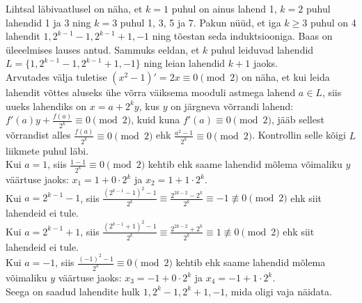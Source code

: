 \documentclass[a4paper, 10pt]{article}
\begin{document}
\bigskip
Lihtsal läbivaatlusel on näha, et $k=1$ puhul on ainus lahend 1, $k=2$ puhul lahendid 1 ja 3 ning $k=3$ puhul 1, 3, 5 ja 7. Pakun nüüd, et iga $k\geq3$ puhul on 4 lahendit $1,2^{k-1}-1,2^{k-1}+1,-1$ ning tõestan seda induktsiooniga. Baas on üleeelmises lauses antud. Sammuks eeldan, et $k$ puhul leiduvad lahendid $L=\{1,2^{k-1}-1,2^{k-1}+1,-1\}$ ning leian lahendid $k+1$ jaoks.\\
Arvutades välja tuletise $(x^2-1)'=2x\equiv0\pmod2$ on näha, et kui leida lahendit võttes aluseks ühe võrra väiksema mooduli astmega lahend $a\in L$, siis uueks lahendiks on $x=a+2^ky$, kus $y$ on järgneva võrrandi lahend: $f'(a)y+\frac{f(a)}{2^k}\equiv0\pmod{2}$, kuid kuna $f'(a)\equiv0\pmod2$, jääb sellest võrrandist alles $\frac{f(a)}{2^k}\equiv0\pmod{2}$ ehk $\frac{a^2-1}{2^k}\equiv0\pmod{2}$. Kontrollin selle kõigi $L$ liikmete puhul läbi.\\
Kui $a=1$, siis $\frac{1-1}{2^k}\equiv0\pmod{2}$ kehtib ehk saame lahendid mõlema võimaliku $y$ väärtuse jaoks: $x_1=1+0\cdot2^k$ ja $x_2=1+1\cdot2^k$.\\
Kui $a=2^{k-1}-1$, siis $\frac{(2^{k-1}-1)^2-1}{2^k}\equiv\frac{2^{2k-2}-2^k}{2^k}\equiv-1\not\equiv0\pmod{2}$ ehk siit lahendeid ei tule.\\
Kui $a=2^{k-1}+1$, siis $\frac{(2^{k-1}+1)^2-1}{2^k}\equiv\frac{2^{2k-2}+2^k}{2^k}\equiv1\not\equiv0\pmod{2}$ ehk siit lahendeid ei tule.\\
Kui $a=-1$, siis $\frac{(-1)^2-1}{2^k}\equiv0\pmod{2}$ kehtib ehk saame lahendid mõlema võimaliku $y$ väärtuse jaoks: $x_3=-1+0\cdot2^k$ ja $x_4=-1+1\cdot2^k$.\\
Seega on saadud lahendite hulk $1,2^k-1,2^k+1,-1$, mida oligi vaja näidata.
\end{document}
